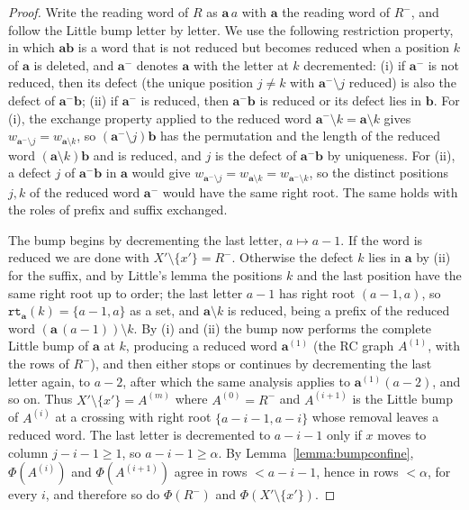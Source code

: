 \documentclass{amsart}
\theoremstyle{definition}
\theoremstyle{remark}
\numberwithin{equation}{subsection}
\newcommand{\wof}[1]{w_{#1}}
\newcommand{\rtt}{\mathtt{rt}}
\begin{document}
\begin{proof}
Write the reading word of $R$ as $\mathbf a\,a$ with $\mathbf a$ the reading word of $R^-$, and follow the Little bump letter by letter. We use the following restriction property, in which $\mathbf a\mathbf b$ is a word that is not reduced but becomes reduced when a position $k$ of $\mathbf a$ is deleted, and $\mathbf a^-$ denotes $\mathbf a$ with the letter at $k$ decremented: (i) if $\mathbf a^-$ is not reduced, then its defect (the unique position $j\neq k$ with $\mathbf a^-\setminus j$ reduced) is also the defect of $\mathbf a^-\mathbf b$; (ii) if $\mathbf a^-$ is reduced, then $\mathbf a^-\mathbf b$ is reduced or its defect lies in $\mathbf b$. For (i), the exchange property applied to the reduced word $\mathbf a^-\setminus k=\mathbf a\setminus k$ gives $\wof{\mathbf a^-\setminus j}=\wof{\mathbf a\setminus k}$, so $(\mathbf a^-\setminus j)\mathbf b$ has the permutation and the length of the reduced word $(\mathbf a\setminus k)\mathbf b$ and is reduced, and $j$ is the defect of $\mathbf a^-\mathbf b$ by uniqueness. For (ii), a defect $j$ of $\mathbf a^-\mathbf b$ in $\mathbf a$ would give $\wof{\mathbf a^-\setminus j}=\wof{\mathbf a\setminus k}=\wof{\mathbf a^-\setminus k}$, so the distinct positions $j,k$ of the reduced word $\mathbf a^-$ would have the same right root. The same holds with the roles of prefix and suffix exchanged.

The bump begins by decrementing the last letter, $a\mapsto a-1$. If the word is reduced we are done with $X'\setminus\{x'\}=R^-$. Otherwise the defect $k$ lies in $\mathbf a$ by (ii) for the suffix, and by Little's lemma the positions $k$ and the last position have the same right root up to order; the last letter $a-1$ has right root $(a-1,a)$, so $\rtt_{\mathbf a}(k)=\{a-1,a\}$ as a set, and $\mathbf a\setminus k$ is reduced, being a prefix of the reduced word $(\mathbf a\,(a-1))\setminus k$. By (i) and (ii) the bump now performs the complete Little bump of $\mathbf a$ at $k$, producing a reduced word $\mathbf a^{(1)}$ (the RC graph $A^{(1)}$, with the rows of $R^-$), and then either stops or continues by decrementing the last letter again, to $a-2$, after which the same analysis applies to $\mathbf a^{(1)}(a-2)$, and so on. Thus $X'\setminus\{x'\}=A^{(m)}$ where $A^{(0)}=R^-$ and $A^{(i+1)}$ is the Little bump of $A^{(i)}$ at a crossing with right root $\{a-i-1,a-i\}$ whose removal leaves a reduced word. The last letter is decremented to $a-i-1$ only if $x$ moves to column $j-i-1\geq 1$, so $a-i-1\geq\alpha$. By Lemma~\ref{lemma:bumpconfine}, $\Phi(A^{(i)})$ and $\Phi(A^{(i+1)})$ agree in rows $<a-i-1$, hence in rows $<\alpha$, for every $i$, and therefore so do $\Phi(R^-)$ and $\Phi(X'\setminus\{x'\})$.
\end{proof}
\end{document}
